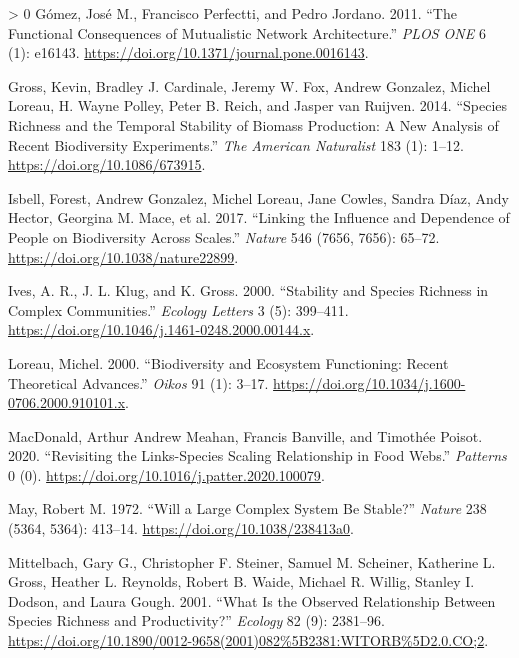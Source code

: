 \documentclass[10pt,oneside]{article}
\newlength{\cslhangindent}
\newenvironment{CSLReferences}[3] %
 {%
  \setlength{\parindent}{0pt}
  \ifodd #1 \everypar{\setlength{\hangindent}{\cslhangindent}}\ignorespaces\fi
  \ifnum #2 > 0
  \setlength{\parskip}{#2\baselineskip}
  \fi
 }%
 {}
\begin{document}
\begin{CSLReferences}{1}{0}
\leavevmode\hypertarget{ref-Gomez2011FunCona}{}%
Gómez, José M., Francisco Perfectti, and Pedro Jordano. 2011. {``The
Functional Consequences of Mutualistic Network Architecture.''}
\emph{PLOS ONE} 6 (1): e16143.
\url{https://doi.org/10.1371/journal.pone.0016143}.

\leavevmode\hypertarget{ref-Gross2014SpeRic}{}%
Gross, Kevin, Bradley J. Cardinale, Jeremy W. Fox, Andrew Gonzalez,
Michel Loreau, H. Wayne Polley, Peter B. Reich, and Jasper van Ruijven.
2014. {``Species Richness and the Temporal Stability of Biomass
Production: A New Analysis of Recent Biodiversity Experiments.''}
\emph{The American Naturalist} 183 (1): 1--12.
\url{https://doi.org/10.1086/673915}.

\leavevmode\hypertarget{ref-Isbell2017LinInf}{}%
Isbell, Forest, Andrew Gonzalez, Michel Loreau, Jane Cowles, Sandra
Díaz, Andy Hector, Georgina M. Mace, et al. 2017. {``Linking the
Influence and Dependence of People on Biodiversity Across Scales.''}
\emph{Nature} 546 (7656, 7656): 65--72.
\url{https://doi.org/10.1038/nature22899}.

\leavevmode\hypertarget{ref-Ives2000StaSpe}{}%
Ives, A. R., J. L. Klug, and K. Gross. 2000. {``Stability and Species
Richness in Complex Communities.''} \emph{Ecology Letters} 3 (5):
399--411. \url{https://doi.org/10.1046/j.1461-0248.2000.00144.x}.

\leavevmode\hypertarget{ref-Loreau2000BioEco}{}%
Loreau, Michel. 2000. {``Biodiversity and Ecosystem Functioning: Recent
Theoretical Advances.''} \emph{Oikos} 91 (1): 3--17.
\url{https://doi.org/10.1034/j.1600-0706.2000.910101.x}.

\leavevmode\hypertarget{ref-MacDonald2020RevLin}{}%
MacDonald, Arthur Andrew Meahan, Francis Banville, and Timothée Poisot.
2020. {``Revisiting the Links-Species Scaling Relationship in Food
Webs.''} \emph{Patterns} 0 (0).
\url{https://doi.org/10.1016/j.patter.2020.100079}.

\leavevmode\hypertarget{ref-May1972WilLar}{}%
May, Robert M. 1972. {``Will a Large Complex System Be Stable?''}
\emph{Nature} 238 (5364, 5364): 413--14.
\url{https://doi.org/10.1038/238413a0}.

\leavevmode\hypertarget{ref-Mittelbach2001WhaObs}{}%
Mittelbach, Gary G., Christopher F. Steiner, Samuel M. Scheiner,
Katherine L. Gross, Heather L. Reynolds, Robert B. Waide, Michael R.
Willig, Stanley I. Dodson, and Laura Gough. 2001. {``What Is the
Observed Relationship Between Species Richness and Productivity?''}
\emph{Ecology} 82 (9): 2381--96.
\url{https://doi.org/10.1890/0012-9658(2001)082\%5B2381:WITORB\%5D2.0.CO;2}.


\end{CSLReferences}
\end{document}
